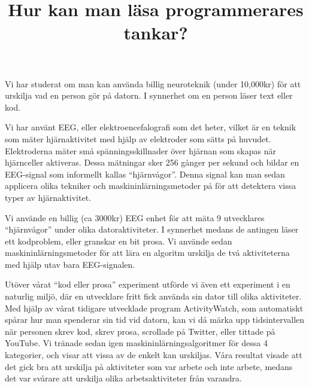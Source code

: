 \documentclass{popsci}
\title{Hur kan man läsa programmerares tankar?}
\begin{document}


\noindent Vi har studerat om man kan använda billig neuroteknik (under 10,000kr) för att urskilja vad en person gör på datorn. I synnerhet om en person läser text eller kod.

Vi har använt EEG, eller elektroencefalografi som det heter, vilket är en teknik som mäter hjärnaktivitet med hjälp av elektroder som sätts på huvudet. Elektroderna mäter små spänningsskillnader över hjärnan som skapas när hjärnceller aktiveras. Dessa mätningar sker 256 gånger per sekund och bildar en EEG-signal som informellt kallas ``hjärnvågor''. Denna signal kan man sedan applicera olika tekniker och maskininlärningsmetoder på för att detektera vissa typer av hjärnaktivitet.

Vi använde en billig (ca 3000kr) EEG enhet för att mäta 9 utvecklares ``hjärnvågor'' under olika datoraktiviteter. I synnerhet medans de antingen läser ett kodproblem, eller granskar en bit prosa. Vi använde sedan maskininlärningsmetoder för att lära en algoritm urskilja de två aktiviteterna med hjälp utav bara EEG-signalen.

Utöver vårat ``kod eller prosa'' experiment utförde vi även ett experiment i en naturlig miljö, där en utvecklare fritt fick använda sin dator till olika aktiviteter. Med hjälp av vårat tidigare utvecklade program ActivityWatch, som automatiskt spårar hur man spenderar sin tid vid datorn, kan vi då märka upp tidsintervallen när personen skrev kod, skrev prosa, scrollade på Twitter, eller tittade på YouTube. Vi tränade sedan igen maskininlärningsalgoritmer för dessa 4 kategorier, och visar att vissa av de enkelt kan urskiljas. Våra resultat visade att det gick bra att urskilja på aktiviteter som var arbete och inte arbete, medans det var svårare att urskilja olika arbetsaktiviteter från varandra.
\end{document}
